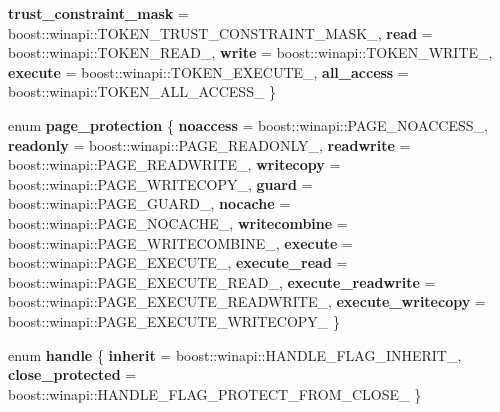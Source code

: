 \begin{DoxyCompactItemize}
{\bfseries trust\+\_\+constraint\+\_\+mask} = boost\+:\+:winapi\+:\+:T\+O\+K\+E\+N\+\_\+\+T\+R\+U\+S\+T\+\_\+\+C\+O\+N\+S\+T\+R\+A\+I\+N\+T\+\_\+\+M\+A\+S\+K\+\_\+, 
{\bfseries read} = boost\+:\+:winapi\+:\+:T\+O\+K\+E\+N\+\_\+\+R\+E\+A\+D\+\_\+, 
{\bfseries write} = boost\+:\+:winapi\+:\+:T\+O\+K\+E\+N\+\_\+\+W\+R\+I\+T\+E\+\_\+, 
\newline
{\bfseries execute} = boost\+:\+:winapi\+:\+:T\+O\+K\+E\+N\+\_\+\+E\+X\+E\+C\+U\+T\+E\+\_\+, 
{\bfseries all\+\_\+access} = boost\+:\+:winapi\+:\+:T\+O\+K\+E\+N\+\_\+\+A\+L\+L\+\_\+\+A\+C\+C\+E\+S\+S\+\_\+
 \}
\item 
\mbox{\label{structdistant_1_1access__rights_a09c6caea8f570f8e2d18c3ef2e2a7804}} 
enum {\bfseries page\+\_\+protection} \{ \newline
{\bfseries noaccess} = boost\+:\+:winapi\+:\+:P\+A\+G\+E\+\_\+\+N\+O\+A\+C\+C\+E\+S\+S\+\_\+, 
{\bfseries readonly} = boost\+:\+:winapi\+:\+:P\+A\+G\+E\+\_\+\+R\+E\+A\+D\+O\+N\+L\+Y\+\_\+, 
{\bfseries readwrite} = boost\+:\+:winapi\+:\+:P\+A\+G\+E\+\_\+\+R\+E\+A\+D\+W\+R\+I\+T\+E\+\_\+, 
{\bfseries writecopy} = boost\+:\+:winapi\+:\+:P\+A\+G\+E\+\_\+\+W\+R\+I\+T\+E\+C\+O\+P\+Y\+\_\+, 
\newline
{\bfseries guard} = boost\+:\+:winapi\+:\+:P\+A\+G\+E\+\_\+\+G\+U\+A\+R\+D\+\_\+, 
{\bfseries nocache} = boost\+:\+:winapi\+:\+:P\+A\+G\+E\+\_\+\+N\+O\+C\+A\+C\+H\+E\+\_\+, 
{\bfseries writecombine} = boost\+:\+:winapi\+:\+:P\+A\+G\+E\+\_\+\+W\+R\+I\+T\+E\+C\+O\+M\+B\+I\+N\+E\+\_\+, 
{\bfseries execute} = boost\+:\+:winapi\+:\+:P\+A\+G\+E\+\_\+\+E\+X\+E\+C\+U\+T\+E\+\_\+, 
\newline
{\bfseries execute\+\_\+read} = boost\+:\+:winapi\+:\+:P\+A\+G\+E\+\_\+\+E\+X\+E\+C\+U\+T\+E\+\_\+\+R\+E\+A\+D\+\_\+, 
{\bfseries execute\+\_\+readwrite} = boost\+:\+:winapi\+:\+:P\+A\+G\+E\+\_\+\+E\+X\+E\+C\+U\+T\+E\+\_\+\+R\+E\+A\+D\+W\+R\+I\+T\+E\+\_\+, 
{\bfseries execute\+\_\+writecopy} = boost\+:\+:winapi\+:\+:P\+A\+G\+E\+\_\+\+E\+X\+E\+C\+U\+T\+E\+\_\+\+W\+R\+I\+T\+E\+C\+O\+P\+Y\+\_\+
 \}
\item 
\mbox{\label{structdistant_1_1access__rights_a57d7f97ab8d52365d0cd4dbcbd4741a4}} 
enum {\bfseries handle} \{ {\bfseries inherit} = boost\+:\+:winapi\+:\+:H\+A\+N\+D\+L\+E\+\_\+\+F\+L\+A\+G\+\_\+\+I\+N\+H\+E\+R\+I\+T\+\_\+, 
{\bfseries close\+\_\+protected} = boost\+:\+:winapi\+:\+:H\+A\+N\+D\+L\+E\+\_\+\+F\+L\+A\+G\+\_\+\+P\+R\+O\+T\+E\+C\+T\+\_\+\+F\+R\+O\+M\+\_\+\+C\+L\+O\+S\+E\+\_\+
 \}
\end{DoxyCompactItemize}



